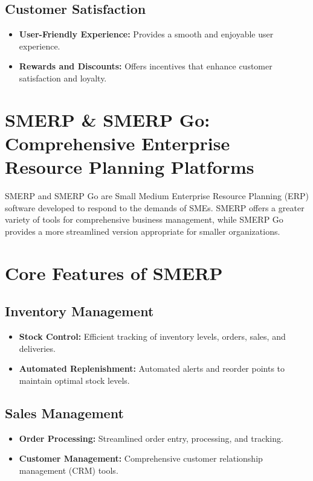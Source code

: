 \documentclass[a4paper,12pt]{report}
\begin{document}
	\subsection{Customer Satisfaction}
	\begin{itemize}
		\item \textbf{User-Friendly Experience:} Provides a smooth and enjoyable user experience.
		\item \textbf{Rewards and Discounts:} Offers incentives that enhance customer satisfaction and loyalty.
	\end{itemize}
	

\section{SMERP \& SMERP Go: Comprehensive Enterprise Resource Planning Platforms}
	SMERP and SMERP Go are Small Medium Enterprise Resource Planning (ERP) software developed to respond to the demands of SMEs. SMERP offers a greater variety of tools for comprehensive business management, while SMERP Go provides a more streamlined version appropriate for smaller organizations.
	
	\section{Core Features of SMERP}
	
	\subsection{Inventory Management}
	\begin{itemize}
		\item \textbf{Stock Control:} Efficient tracking of inventory levels, orders, sales, and deliveries.
		\item \textbf{Automated Replenishment:} Automated alerts and reorder points to maintain optimal stock levels.
	\end{itemize}
	
	\subsection{Sales Management}
	\begin{itemize}
		\item \textbf{Order Processing:} Streamlined order entry, processing, and tracking.
		\item \textbf{Customer Management:} Comprehensive customer relationship management (CRM) tools.
	\end{itemize}
	
\end{document}
